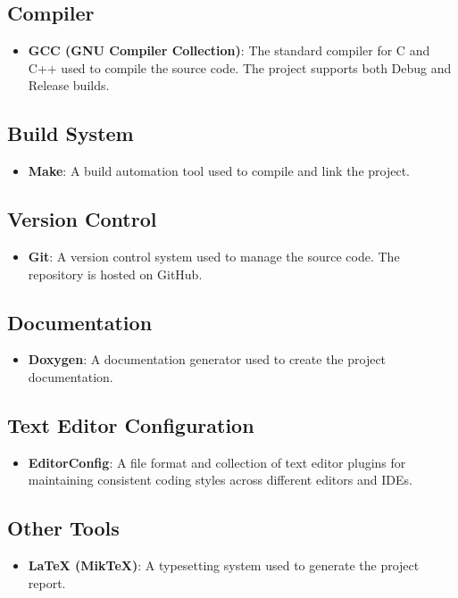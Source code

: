 \documentclass[12pt,a4paper]{report}
\begin{document}
\subsection*{Compiler}
\begin{itemize}
    \item \textbf{GCC (GNU Compiler Collection)}: The standard compiler for C and C++ used to compile the source code.
    The project supports both Debug and Release builds.
\end{itemize}

\subsection*{Build System}
\begin{itemize}
    \item \textbf{Make}: A build automation tool used to compile and link the project.
\end{itemize}

\subsection*{Version Control}
\begin{itemize}
    \item \textbf{Git}: A version control system used to manage the source code. The repository is hosted on GitHub.
\end{itemize}

\subsection*{Documentation}
\begin{itemize}
    \item \textbf{Doxygen}: A documentation generator used to create the project documentation.
\end{itemize}

\subsection*{Text Editor Configuration}
\begin{itemize}
    \item \textbf{EditorConfig}: A file format and collection of text editor plugins for maintaining consistent
    coding styles across different editors and IDEs.
\end{itemize}

\subsection*{Other Tools}
\begin{itemize}
    \item \textbf{LaTeX (MikTeX)}: A typesetting system used to generate the project report.
\end{itemize}
\end{document}
